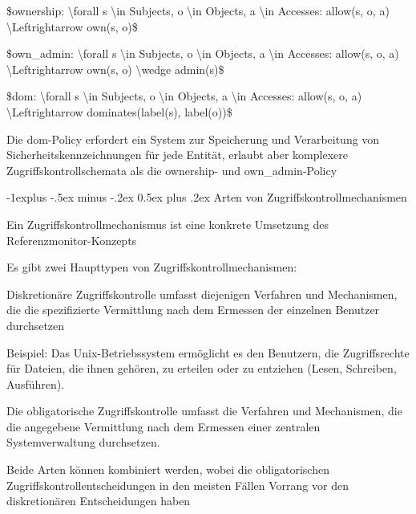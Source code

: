 \documentclass[a4paper]{article}
\makeatletter
\renewcommand{\subsection}{\@startsection{subsection}{2}{0mm}%
 {-1explus -.5ex minus -.2ex}%
 {0.5ex plus .2ex}%
 {\normalfont\normalsize\bfseries}}
\makeatother
\begin{document}
\begin{multicols}{3}
\begin{itemize*}
            \begin{itemize*}
                  \item \$ownership: \textbackslash forall s \textbackslash in Subjects, o \textbackslash in Objects, a \textbackslash in Accesses: allow(s, o, a) \textbackslash Leftrightarrow own(s, o)\$
                  \item \$own\_admin: \textbackslash forall s \textbackslash in Subjects, o \textbackslash in Objects, a \textbackslash in Accesses: allow(s, o, a) \textbackslash Leftrightarrow own(s, o) \textbackslash wedge admin(s)\$
                  \item \$dom: \textbackslash forall s \textbackslash in Subjects, o \textbackslash in Objects, a \textbackslash in Accesses: allow(s, o, a) \textbackslash Leftrightarrow dominates(label(s), label(o))\$
            \end{itemize*}
            \item
            Die dom-Policy erfordert ein System zur Speicherung und Verarbeitung
            von Sicherheitskennzeichnungen für jede Entität, erlaubt aber
            komplexere Zugriffskontrollschemata als die ownership- und
            own\_admin-Policy
      \end{itemize*}


      \subsection{Arten von
            Zugriffskontrollmechanismen}

      \begin{itemize*}
            \item
            Ein Zugriffskontrollmechanismus ist eine konkrete Umsetzung des
            Referenzmonitor-Konzepts
            \item
            Es gibt zwei Haupttypen von Zugriffskontrollmechanismen:

            \begin{itemize*}
                  \item Diskretionäre Zugriffskontrolle umfasst diejenigen Verfahren und Mechanismen, die die spezifizierte Vermittlung nach dem Ermessen der einzelnen Benutzer durchsetzen
                  \begin{itemize*} \item Beispiel: Das Unix-Betriebssystem ermöglicht es den Benutzern, die Zugriffsrechte für Dateien, die ihnen gehören, zu erteilen oder zu entziehen (Lesen, Schreiben, Ausführen). \end{itemize*}
                  \item Die obligatorische Zugriffskontrolle umfasst die Verfahren und Mechanismen, die die angegebene Vermittlung nach dem Ermessen einer zentralen Systemverwaltung durchsetzen.
            \end{itemize*}
            \item
            Beide Arten können kombiniert werden, wobei die obligatorischen
            Zugriffskontrollentscheidungen in den meisten Fällen Vorrang vor den
            diskretionären Entscheidungen haben


\end{itemize*}
\end{multicols}
\end{document}
